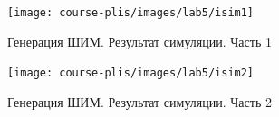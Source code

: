 \begin{figure}[h!]
	\centering
	\texttt{[image: course-plis/images/lab5/isim1]}
	\caption{Генерация ШИМ. Результат симуляции. Часть 1}
	\label{fig:5isim1}
\end{figure}

\begin{figure}[t!]
	\centering
	\texttt{[image: course-plis/images/lab5/isim2]}
	\caption{Генерация ШИМ. Результат симуляции. Часть 2}
	\label{fig:5isim2}
\end{figure}





